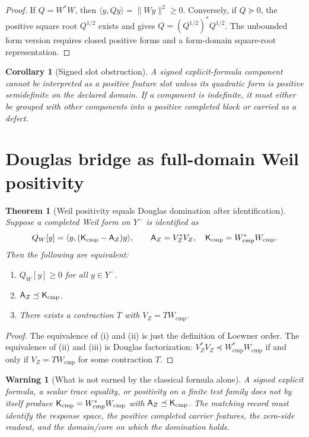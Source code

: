 \documentclass[11pt]{article}
\newtheorem{theorem}{Theorem}
\newtheorem{warning}{Warning}
\newtheorem{corollary}{Corollary}
\newcommand{\K}{\mathsf K}
\newcommand{\A}{\mathsf A}
\newcommand{\Y}{Y^-}
\newcommand{\Wcmp}{W_{\mathrm{cmp}}}
\newcommand{\VZ}{V_Z}
\begin{document}
\begin{proof}
If \(Q=W^*W\), then \(\langle y,Qy\rangle=\|Wy\|^2\ge0\). Conversely, if \(Q\succeq0\), the positive square root \(Q^{1/2}\) exists and gives \(Q=(Q^{1/2})^*Q^{1/2}\). The unbounded form version requires closed positive forms and a form-domain square-root representation.\qedhere
\end{proof}

\begin{corollary}[Signed slot obstruction]
A signed explicit-formula component cannot be interpreted as a positive feature slot unless its quadratic form is positive semidefinite on the declared domain. If a component is indefinite, it must either be grouped with other components into a positive completed block or carried as a defect.
\end{corollary}

\section{Douglas bridge as full-domain Weil positivity}

\begin{theorem}[Weil positivity equals Douglas domination after identification]
Suppose a completed Weil form on \(\Y\) is identified as
\[
  Q_W[y]
  =\langle y,(\K_{\rm cmp}-\A_Z)y\rangle,
  \qquad
  \A_Z=\VZ^*\VZ,
  \quad
  \K_{\rm cmp}=\Wcmp^*\Wcmp.
\]
Then the following are equivalent:
\begin{enumerate}[label=(\roman*)]
\item \(Q_W[y]\ge0\) for all \(y\in\Y\).
\item \(\A_Z\preceq\K_{\rm cmp}\).
\item There exists a contraction \(T\) with \(\VZ=T\Wcmp\).
\end{enumerate}
\end{theorem}

\begin{proof}
The equivalence of (i) and (ii) is just the definition of Loewner order. The equivalence of (ii) and (iii) is Douglas factorization: \(\VZ^*\VZ\preceq\Wcmp^*\Wcmp\) if and only if \(\VZ=T\Wcmp\) for some contraction \(T\).\qedhere
\end{proof}

\begin{warning}[What is not earned by the classical formula alone]
A signed explicit formula, a scalar trace equality, or positivity on a finite test family does not by itself produce \(\K_{\rm cmp}=\Wcmp^*\Wcmp\) with \(\A_Z\preceq\K_{\rm cmp}\). The matching record must identify the response space, the positive completed carrier features, the zero-side readout, and the domain/core on which the domination holds.
\end{warning}
\end{document}
